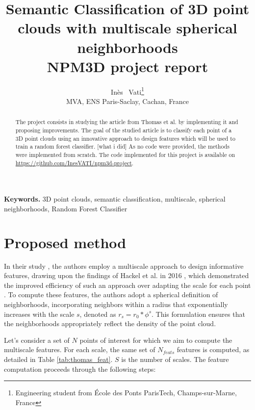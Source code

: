 \documentclass{article}
\title{Semantic Classification of 3D point clouds with multiscale spherical neighborhoods \\ \vspace{.3cm}
\small{NPM3D project report}
}
\author{%
  Inès ~Vati\thanks{Engineering student from École des Ponts ParisTech, Champs-sur-Marne, France} \\
  MVA, ENS Paris-Saclay, Cachan, France\\
  \texttt{\email{ines.vati@eleves.enpc.fr}}
}
\date{}
\begin{document}
\maketitle

\begin{abstract}
    The project consists in studying the article from Thomas et al. \cite{thomas_semantic_2018} by implementing it and proposing improvements. The goal of the studied article is to classify each point of a 3D point clouds using an innovative approach to design features which will be used to train a random forest classifier. 
    [what i did]
    As no code were provided, the methods were implemented from scratch. The code implemented for this project is available on \url{https://github.com/InesVATI/npm3d-project}. 
\end{abstract}
\textbf{Keywords.} 3D point clouds, semantic classification, multiscale, spherical neighborhoods, Random Forest Classifier



\section{Proposed method}

In their study \cite{thomas_semantic_2018}, the authors employ a multiscale approach to design informative features, drawing upon the findings of Hackel et al. in 2016 \cite{hackel_fast_nodate}, which demonstrated the improved efficiency of such an approach over adapting the scale for each point \cite{weinmann_semantic_2015}. To compute these features, the authors adopt a spherical definition of neighborhoods, incorporating neighbors within a radius that exponentially increases with the scale $s$, denoted as $r_s = r_0 * \phi^s$. This formulation ensures that the neighborhoods appropriately reflect the density of the point cloud. 

Let's consider a set of $N$ points of interest for which we aim to compute the multiscale features. For each scale, the same set of $N_{feats}$ features is computed, as detailed in Table \ref{tab:thomas_feat}. $S$ is the number of scales. The feature computation proceeds through the following steps:
\end{document}
